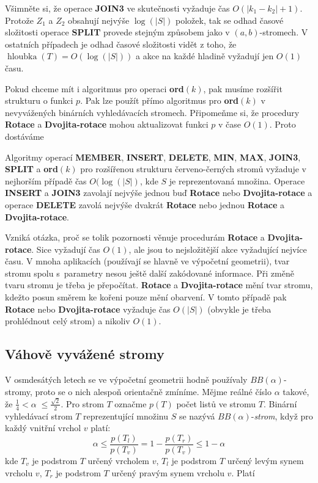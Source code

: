 \documentclass[a4paper,12pt]{article}
\DeclareMathOperator*{\hloubka}{hloubka}
\begin{document}
Všimněte si, že operace {\bf JOIN3} ve skutečnosti 
vyžaduje čas $O(|k_1-k_2|+1)$. Protože $Z_1$ a $Z_2$ obsahují nejvýše 
$\log(|S|)$ položek, tak se odhad časové složitosti operace {\bf SPLIT }
prove\-de stejným způsobem jako v $(a,b)$-stromech. 
V ostatních pří\-pa\-dech je odhad časové složitosti vidět z toho, 
že $\hloubka(T)=O(\log(|S|))$ a akce na každé hladině vyžadují jen 
$O(1)$ času.

Pokud chceme mít i algoritmus pro operaci {\bf ord$
(k)$}, pak 
musíme rozšířit strukturu o funkci $p$. Pak lze použít přímo 
algoritmus pro {\bf ord$(k)$} v nevyvážených binárních vyhledávacích 
stromech. Připomeňme si, že procedury {\bf Rotace} a {\bf Dvojita-rotace }
mohou aktualizovat funkci $p$ v čase $O(1)$. Proto dostáváme 

\begin{veta}Algoritmy operací {\bf MEMBER}, 
{\bf INSERT}, {\bf DE\-LE\-TE}, {\bf MIN}, {\bf MAX}, {\bf JOIN3}, {\bf SPLIT} a {\bf ord$
(k)$} pro 
roz\-ší\-ře\-nou strukturu červeno-černých stromů vyžaduje 
v nejhorším případě čas $O(\log(|S|)$, kde $S$ je reprezentovaná 
množina.  Operace {\bf INSERT} a {\bf JOIN3} zavolají nejvýše jednou buď 
{\bf Rotace} nebo {\bf Dvojita-rota\-ce} a operace {\bf DELETE} zavolá nejvýše 
dvakrát {\bf Rotace} nebo jednou {\bf Rotace} a {\bf Dvojita-rotace}.  \end{veta}

Vzniká otázka, proč se tolik pozornosti věnuje 
procedurám {\bf Rotace} a {\bf Dvojita-rotace}. Sice vyžadují čas 
$O(1)$, ale jsou to nej\-složitější akce vyžadující nejvíce času. 
V mnoha aplikacích (pou\-žívají se hlavně ve výpočetní geometrii), 
tvar stromu spolu s~parametry nesou ještě 
další zakódované informace. Při změně tvaru stromu je 
třeba je přepočítat. {\bf Rotace} a {\bf Dvojita-rotace} mění tvar 
stromu, kdežto posun směrem ke kořeni pouze mění 
obarvení. V tomto případě pak {\bf Rotace} nebo {\bf Dvo\-ji\-ta-rotace }
vyžaduje čas $O(|S|)$ (obvykle je třeba prohlédnout celý 
strom) a nikoliv $O(1)$.

\subsection{Váhově vyvážené stromy}

V osmdesátých letech se ve výpočetní geometrii 
hodně použí\-va\-ly $BB(\alpha )$-stromy, proto se o nich alespoň 
orientačně zmíníme. Mějme reálné číslo $
\alpha$ takové, že 
$\frac 14<\alpha\;\le\frac {\sqrt 2}2$. Pro strom $T$ označme $
p(T)$ počet 
listů ve stromu $T$. Binární vyhledávací strom $T$ 
reprezentující množinu $S$ se nazývá $BB(\alpha )$-\emph{strom}, 
když pro každý vnitřní vrchol $v$ platí:
$$\alpha\le\frac {p(T_l)}{p (T_v)}=1-\frac {p(T_r)}{p(T_v)}\le 1-\alpha$$
kde $T_v$ je podstrom $T$ určený vrcholem $v$, $T_l$ je podstrom 
$T$ určený levým synem vrcholu $v$, $T_r$ je podstrom $T$ 
určený pravým synem vrcholu $v$. Platí
\end{document}
